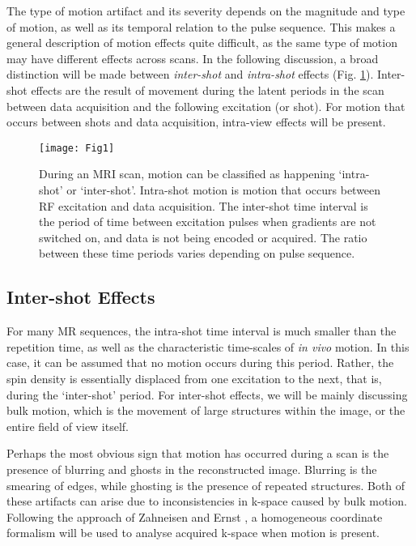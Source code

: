 \documentclass[class=article, crop=false]{standalone}
\begin{document}
The type of motion artifact and its severity depends on the magnitude and type of motion, as well as its temporal relation to the pulse sequence. This makes a general description of motion effects quite difficult, as the same type of motion may have different effects across scans. In the following discussion, a broad distinction will be made between \textit{inter-shot} and \textit{intra-shot} effects (Fig. \ref{fig:fig1}). Inter-shot effects are the result of movement during the latent periods in the scan between data acquisition and the following excitation (or shot). For motion that occurs between shots and data acquisition, intra-view effects will be present.

\begin{figure}[h]
	\texttt{[image: Fig1]}
	\centering
	\caption{During an MRI scan, motion can be classified as happening `intra-shot' or `inter-shot'. Intra-shot motion is motion that occurs between RF excitation and data acquisition. The inter-shot time interval is the period of time between excitation pulses when gradients are not switched on, and data is not being encoded or acquired. The ratio between these time periods varies depending on pulse sequence.}
	\label{fig:fig1}
\end{figure}

\subsection{Inter-shot Effects}

For many MR sequences, the intra-shot time interval is much smaller than the repetition time, as well as the characteristic time-scales of \textit{in vivo} motion. In this case, it can be assumed that no motion occurs during this period. Rather, the spin density is essentially displaced from one excitation to the next, that is, during the `inter-shot' period. For inter-shot effects, we will be mainly discussing bulk motion, which is the movement of large structures within the image, or the entire field of view itself. 
\par
Perhaps the most obvious sign that motion has occurred during a scan is the presence of blurring and ghosts in the reconstructed image. Blurring is the smearing of edges, while ghosting is the presence of repeated structures. Both of these artifacts can arise due to inconsistencies in k-space caused by bulk motion. Following the approach of Zahneisen and Ernst \parencite*{Zahneisen2016}, a homogeneous coordinate formalism will be used to analyse acquired k-space when motion is present.
\end{document}

